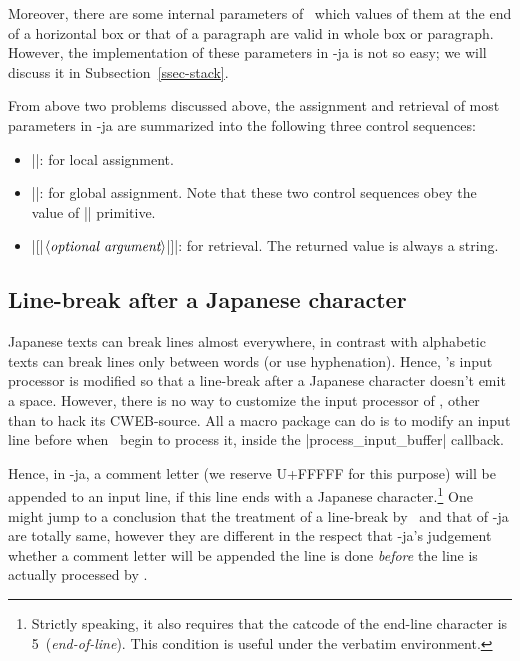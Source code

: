 \documentclass{ajt}
\begin{document}
Moreover, there are some internal parameters of \pTeX\ which values of them at the end of a
horizontal box or that of a paragraph are valid in whole box or
paragraph.  However, the implementation of these parameters in
\LuaTeX-ja is not so easy; we will discuss it in Subsection~\ref{ssec-stack}.

From above two problems  discussed above, the assignment and retrieval
of most parameters in \LuaTeX-ja are summarized into the following
three control sequences:
\begin{itemize}
\item ||: for local
      assignment.
\item |\ltjglobalsetparameter|: for global assignment. Note that these two control
      sequences obey the value of |\globaldefs| primitive.
\item |[{|$\langle\hbox{\it optional
      argument}\rangle$|}]|: for retrieval. The returned value is always
      a string.
\end{itemize}

\subsection{Line-break after a Japanese character}
\label{ssec-line} 

Japanese texts can break lines almost everywhere, in contrast with
alphabetic texts can break lines only between words (or use
hyphenation). Hence, \pTeX's input processor is modified so that a
line-break after a Japanese character doesn't emit a space. However,
there is no way to customize the input processor of \LuaTeX, other than
to hack its CWEB-source. All a macro package can do is to modify an input line before
when \LuaTeX\ begin to process it, inside the |process_input_buffer|
callback.

Hence, in \LuaTeX-ja, a comment letter (we reserve U+FFFFF for this
purpose) will be appended to an input line, if this line ends with a Japanese
character.\footnote{Strictly speaking, it also requires that the catcode
of the end-line character is 5~(\emph{end-of-line}). This condition is
useful under the verbatim environment.}  One might jump to a conclusion
that the treatment of a line-break by \pTeX\ and that of \LuaTeX-ja are
totally same, however they are different in the respect that \LuaTeX-ja's
judgement whether a comment letter will be appended the line is done
\emph{before} the line is actually processed by \LuaTeX.
\end{document}
